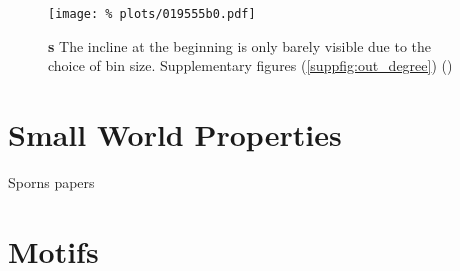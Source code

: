\begin{figure}[H]
  \centering
  \texttt{[image: \%
    plots/019555b0.pdf]}
  \caption{\textbf{s} The incline at the beginning is only barely
    visible due to the choice of bin size. Supplementary figures
    (\autoref{suppfig:out_degree}) ()}
  \label{fig:out_degree_ER_compare}
\end{figure}


\section{Small World Properties}

Sporns papers

\section{Motifs}



 




